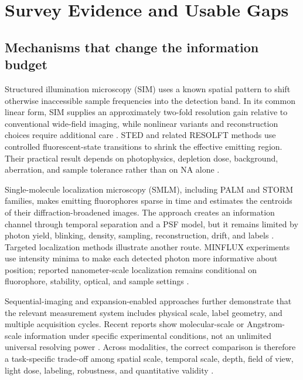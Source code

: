 \documentclass[conference]{IEEEtran}
\begin{document}
\section{Survey Evidence and Usable Gaps}

\subsection{Mechanisms that change the information budget}

Structured illumination microscopy (SIM) uses a known spatial pattern to shift otherwise inaccessible sample frequencies into the detection band. In its common linear form, SIM supplies an approximately two-fold resolution gain relative to conventional wide-field imaging, while nonlinear variants and reconstruction choices require additional care \cite{hell2015,wegel2016}. STED and related RESOLFT methods use controlled fluorescent-state transitions to shrink the effective emitting region. Their practical result depends on photophysics, depletion dose, background, aberration, and sample tolerance rather than on NA alone \cite{hell2015,wegel2016}.

Single-molecule localization microscopy (SMLM), including PALM and STORM families, makes emitting fluorophores sparse in time and estimates the centroids of their diffraction-broadened images. The approach creates an information channel through temporal separation and a PSF model, but it remains limited by photon yield, blinking, density, sampling, reconstruction, drift, and labels \cite{baddeley2018,lelek2021}. Targeted localization methods illustrate another route. MINFLUX experiments use intensity minima to make each detected photon more informative about position; reported nanometer-scale localization remains conditional on fluorophore, stability, optical, and sample settings \cite{balzarotti2017,schmidt2021}.

Sequential-imaging and expansion-enabled approaches further demonstrate that the relevant measurement system includes physical scale, label geometry, and multiple acquisition cycles. Recent reports show molecular-scale or Angstrom-scale information under specific experimental conditions, not an unlimited universal resolving power \cite{reinhardt2023,zwettler2020}. Across modalities, the correct comparison is therefore a task-specific trade-off among spatial scale, temporal scale, depth, field of view, light dose, labeling, robustness, and quantitative validity \cite{valli2021,wegel2016}.
\end{document}
